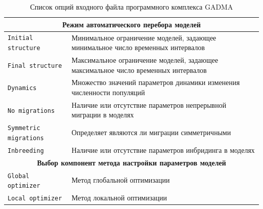 \begin{table}[!htbp]
{\begin{tabular}{|p{4.3cm}|p{8cm}|}
        \hline
        \multicolumn{2}{|c|}{\textbf{Режим автоматического перебора моделей}} \\
        \hline
        \texttt{Initial structure} & Минимальное ограничение моделей, задающее минимальное число временных интервалов\\
        \hline
        \texttt{Final structure} & Максимальное ограничение моделей, задающее максимальное число временных интервалов \\
        \hline
        \texttt{Dynamics} & Множество значений параметров динамики изменения численности популяций \\
        \hline
        \texttt{No migrations} & Наличие или отсутствие параметров непрерывной миграции в моделях \\
        \hline
        \texttt{Symmetric migrations} & Определяет являются ли миграции симметричными \\
        \hline
        \texttt{Inbreeding} & Наличие или отсутствие параметров инбридинга в моделях \\
        \hline
        \multicolumn{2}{|c|}{\textbf{Выбор компонент метода настройки параметров моделей}} \\
        \hline
        \texttt{Global optimizer} & Метод глобальной оптимизации \\
        \hline
        \texttt{Local optimizer} & Метод локальной оптимизации\\
        \hline
    \end{tabular}%
    }
    \caption{Список опций входного файла программного комплекса GADMA}
    \label{tab:part5:input}
\end{table}

